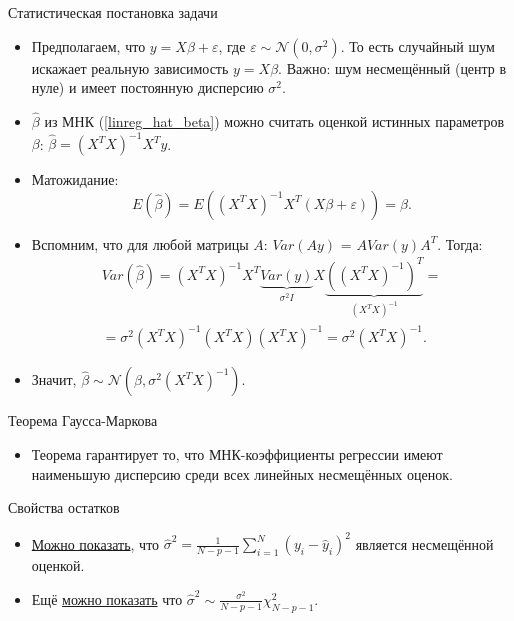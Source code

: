 \documentclass[9pt]{beamer}
\begin{document}
\begin{frame}{Статистическая постановка задачи}
    \begin{itemize}
        \item Предполагаем, что $y = X\beta + \varepsilon$, где $\varepsilon \sim \mathcal{N}(0, \sigma^2)$. То есть случайный шум искажает реальную зависимость $y=X\beta$. Важно: шум несмещённый (центр в нуле) и имеет постоянную дисперсию $\sigma^2$.
        \item $\hat \beta$ из МНК (\ref{linreg_hat_beta}) можно считать оценкой истинных параметров $\beta$: $\hat \beta = (X^TX)^{-1}X^Ty$.
        \item Матожидание:
        $$E(\hat \beta) = E((X^TX)^{-1}X^T(X\beta + \varepsilon)) = \beta.$$
        \item Вспомним, что для любой матрицы $A$: $Var(Ay)$ = $A Var(y) A^T$. Тогда: 
        \begin{multline*}
            Var(\hat\beta) = (X^TX)^{-1}X^T \underbrace{Var(y)}_{\sigma^2 I} X\underbrace{((X^TX)^{-1})^T}_{(X^T X)^{-1}}=\\
            = \sigma^2 (X^TX)^{-1}(X^TX)(X^TX)^{-1} = \sigma^2 (X^TX)^{-1}.
        \end{multline*}
        \item Значит, $\hat \beta \sim \mathcal{N}(\beta, \sigma^2(X^TX)^{-1})$.
    \end{itemize}
\end{frame}

\begin{frame}{Теорема Гаусса-Маркова}
    \begin{itemize}
        \item Теорема гарантирует то, что МНК-коэффициенты регрессии имеют наименьшую дисперсию среди всех линейных несмещённых оценок.
    \end{itemize}
\end{frame}

\begin{frame}{Свойства остатков}
\begin{itemize}
    \item \href{https://stats.stackexchange.com/questions/76738/proof-that-regression-residual-error-is-an-unbiased-estimate-of-error-variance}{Можно показать}, что $\hat\sigma^2 = \frac{1}{N - p - 1}\sum_{i=1}^N(y_i - \hat y_i)^2$ является несмещённой оценкой.
    \item Ещё \href{https://stats.stackexchange.com/questions/20227/why-is-rss-distributed-chi-square-times-n-p/20230\#20230}{можно показать} что $\hat \sigma^2 \sim \frac{\sigma^2}{N-p-1}\chi^2_{N-p-1}$.
\end{itemize}
\end{frame}
\end{document}

